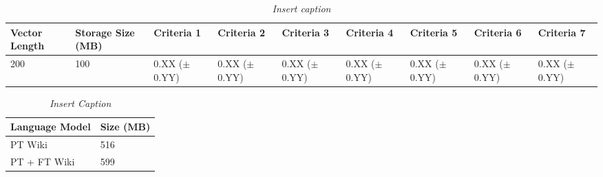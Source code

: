 \documentclass[a4paper,twoside,phd]{BYUPhys}
\begin{document}
\begin{table}[H]
	\centering
	\begin{tabular}{|p{1.7cm}|p{1.65cm}|p{1.65cm}|p{1.65cm}|p{1.6cm}|p{1.65cm}|p{1.65cm}|p{1.65cm}|p{1.65cm}|}
		\hline
		Vector Length & Storage Size (MB) & Criteria 1                                                                           & Criteria 2    & Criteria 3 & Criteria 4 & Criteria 5 & Criteria 6 & Criteria 7                                                                                                                                                                                                                                                                                                                                                          \\
		\hline                                                                                                                                               
		
		200  & 100 & 0.XX \newline ($\pm$ 0.YY) & 0.XX \newline ($\pm$ 0.YY) & 0.XX \newline ($\pm$ 0.YY) & 0.XX \newline ($\pm$ 0.YY) & 0.XX \newline ($\pm$ 0.YY)  & 0.XX \newline ($\pm$ 0.YY)   & 0.XX \newline ($\pm$ 0.YY)  \\
		\hline

		
		
	\end{tabular}
	\caption{\textit{Insert caption}}
	\label{table:w2vStorage}
\end{table}

\begin{table}[H]
	\centering
	\begin{tabular}{|p{3cm}|p{2cm}|}
		\hline
		Language Model & Size (MB)                                                                                                                                                                                                                                                                                                                                                    \\
		\hline                                                                                                                                              
		
		PT Wiki  & 516  \\
		\hline
		
		PT + FT Wiki  & 599  \\
		\hline
		
		
		
	\end{tabular}
	\caption{\textit{Insert Caption}}
	\label{table:DLStorageRequirements}
\end{table}
\end{document}
